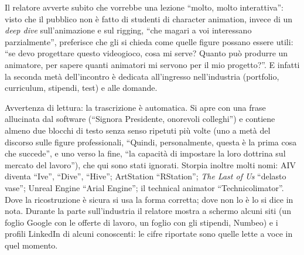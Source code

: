 Il relatore avverte subito che vorrebbe una lezione ``molto, molto
interattiva'': visto che il pubblico non è fatto di studenti di character
animation, invece di un \emph{deep dive} sull'animazione e sul rigging,
``che magari a voi interessano parzialmente'', preferisce che gli si chieda
come quelle figure possano essere utili: ``se devo progettare questo
videogioco, cosa mi serve? Quanto può produrre un animatore, per sapere
quanti animatori mi servono per il mio progetto?''. E infatti la seconda
metà dell'incontro è dedicata all'ingresso nell'industria (portfolio,
curriculum, stipendi, test) e alle domande.

Avvertenza di lettura: la trascrizione è automatica. Si apre con una frase
allucinata dal software (``Signora Presidente, onorevoli colleghi'') e
contiene almeno due blocchi di testo senza senso ripetuti più volte (uno a
metà del discorso sulle figure professionali, ``Quindi, personalmente,
questa è la prima cosa che succede'', e uno verso la fine, ``la capacità di
impostare la loro dottrina sul mercato del lavoro''), che qui sono stati
ignorati. Storpia inoltre molti nomi: AIV diventa ``Ive'', ``Dive'',
``Hive''; ArtStation ``RStation''; \emph{The Last of Us} ``delasto vase'';
Unreal Engine ``Arial Engine''; il technical animator ``Technicolimator''.
Dove la ricostruzione è sicura si usa la forma corretta; dove non lo è lo si
dice in nota. Durante la parte sull'industria il relatore mostra a schermo
alcuni siti (un foglio Google con le offerte di lavoro, un foglio con gli
stipendi, Numbeo) e i profili LinkedIn di alcuni conoscenti: le cifre
riportate sono quelle lette a voce in quel momento.

